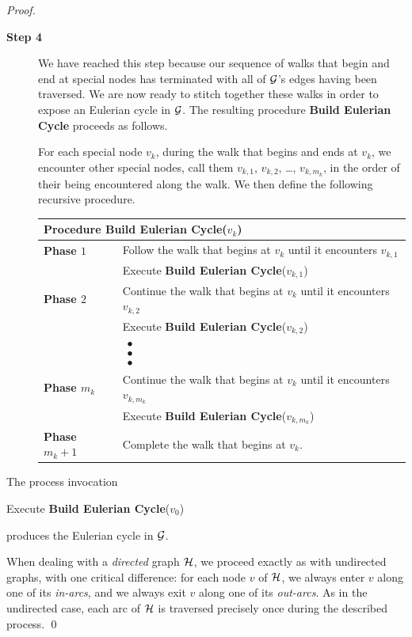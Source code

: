 \begin{proof}
\begin{description}
\item[{\bf Step 4}]
We have reached this step because our sequence of walks that begin and
end at special nodes has terminated with all of $\mbox{$\cal G$}$'s edges having
been traversed.  We are now ready to stitch together these walks in
order to expose an Eulerian cycle in $\mbox{$\cal G$}$.  The resulting procedure
{\bf Build Eulerian Cycle} proceeds as follows.

For each special node $v_k$, during the walk that begins and ends at
$v_k$, we encounter other special nodes, call them $v_{k,1}$,
$v_{k,2}$, \ldots, $v_{k,{m_k}}$, in the order of their being
encountered along the walk.  We then define the following recursive
procedure.

\medskip

\begin{tabular}{|ll|}
\multicolumn{2}{l}{{\bf Procedure Build Eulerian Cycle}($v_k$)} \\
\hline
{\bf Phase $1$} &
Follow the walk that begins at $v_k$ until it encounters $v_{k,1}$ \\
  &
Execute {\bf Build Eulerian Cycle}($v_{k,1}$) \\
\hline
{\bf Phase $2$} &
Continue the walk that begins at $v_k$ until it encounters $v_{k,2}$ \\
  &
Execute {\bf Build Eulerian Cycle}($v_{k,2}$) \\
\hline
  &
$\begin{array}{c}
\bullet \\
\bullet \\
\bullet
\end{array}
$ \\
\hline
{\bf Phase $m_k$} &
Continue the walk that begins at $v_k$ until it encounters $v_{k,m_k}$ \\
   &
Execute {\bf Build Eulerian Cycle}($v_{k,m_k}$) \\
\hline
{\bf Phase $m_k +1$} &
Complete the walk that begins at $v_k$. \\
\hline
\end{tabular}
\end{description}

\medskip

\noindent
The process invocation

Execute {\bf Build Eulerian Cycle}($v_0$)

\noindent
produces the Eulerian cycle in $\mbox{$\cal G$}$.

\bigskip

When dealing with a {\em directed} graph $\mbox{$\cal H$}$, we proceed exactly as
with undirected graphs, with one critical difference: for each node
$v$ of $\mbox{$\cal H$}$, we always enter $v$ along one of its {\em in-arcs}, and
we always exit $v$ along one of its {\em out-arcs}.  As in the
undirected case, each arc of $\mbox{$\cal H$}$ is traversed precisely once during
the described process.  \qed
\end{proof}

